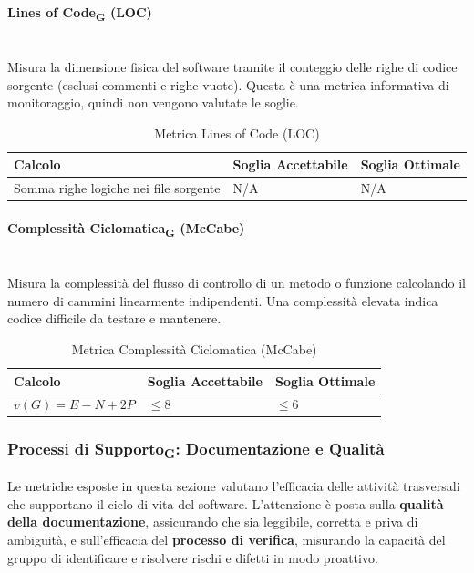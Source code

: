\documentclass[11pt,a4paper]{article}
\begin{document}
\paragraph{Lines of Code\textsubscript{G} (LOC)} \hfill \\
Misura la dimensione fisica del software tramite il conteggio delle righe di codice sorgente (esclusi commenti e righe vuote). Questa è una metrica informativa di monitoraggio, quindi non vengono valutate le soglie.

\begin{table}[H]
    \centering
    \renewcommand{\arraystretch}{1.5}
    \begin{tabular}{|M{0.4\textwidth}|M{0.25\textwidth}|M{0.25\textwidth}|}
        \hline
        \textbf{Calcolo} & \textbf{Soglia Accettabile} & \textbf{Soglia Ottimale} \\
        \hline
        Somma righe logiche nei file sorgente & N/A & N/A \\
        \hline
    \end{tabular}
    \caption{Metrica Lines of Code (LOC)}
\end{table}

\paragraph{Complessità Ciclomatica\textsubscript{G} (McCabe)} \hfill \\
Misura la complessità del flusso di controllo di un metodo o funzione calcolando il numero di cammini linearmente indipendenti. Una complessità elevata indica codice difficile da testare e mantenere.

\begin{table}[H]
    \centering
    \renewcommand{\arraystretch}{1.5}
    \begin{tabular}{|M{0.4\textwidth}|M{0.25\textwidth}|M{0.25\textwidth}|}
        \hline
        \textbf{Calcolo} & \textbf{Soglia Accettabile} & \textbf{Soglia Ottimale} \\
        \hline
        $v(G) = E - N + 2P$ & $\le 8$ & $\le 6$ \\
        \hline
    \end{tabular}
    \caption{Metrica Complessità Ciclomatica (McCabe)}
\end{table}

\newpage
\subsubsection{Processi di Supporto\textsubscript{G}: Documentazione e Qualità}
Le metriche esposte in questa sezione valutano l'efficacia delle attività trasversali che supportano il ciclo di vita del software.
L'attenzione è posta sulla \textbf{qualità della documentazione}, assicurando che sia leggibile, corretta e priva di ambiguità, e sull'efficacia del \textbf{processo di verifica}, misurando la capacità del gruppo di identificare e risolvere rischi e difetti in modo proattivo.
\end{document}
